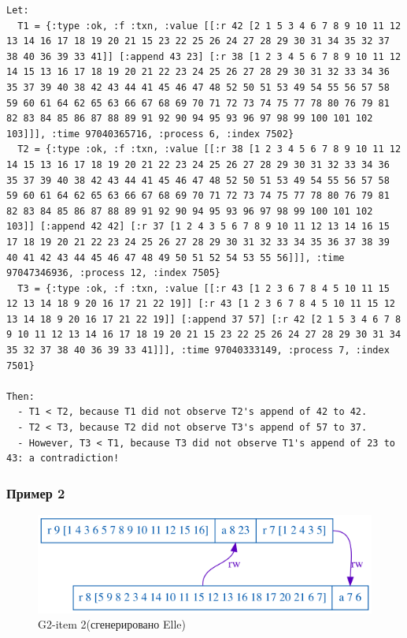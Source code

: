\documentclass[12pt,  openany]{book}
\begin{document}
\begin{lstlisting}[caption={Пояснение к G2-item 1 аномалии (сгенерировано Elle)}]
Let:
  T1 = {:type :ok, :f :txn, :value [[:r 42 [2 1 5 3 4 6 7 8 9 10 11 12 13 14 16 17 18 19 20 21 15 23 22 25 26 24 27 28 29 30 31 34 35 32 37 38 40 36 39 33 41]] [:append 43 23] [:r 38 [1 2 3 4 5 6 7 8 9 10 11 12 14 15 13 16 17 18 19 20 21 22 23 24 25 26 27 28 29 30 31 32 33 34 36 35 37 39 40 38 42 43 44 41 45 46 47 48 52 50 51 53 49 54 55 56 57 58 59 60 61 64 62 65 63 66 67 68 69 70 71 72 73 74 75 77 78 80 76 79 81 82 83 84 85 86 87 88 89 91 92 90 94 95 93 96 97 98 99 100 101 102 103]]], :time 97040365716, :process 6, :index 7502}
  T2 = {:type :ok, :f :txn, :value [[:r 38 [1 2 3 4 5 6 7 8 9 10 11 12 14 15 13 16 17 18 19 20 21 22 23 24 25 26 27 28 29 30 31 32 33 34 36 35 37 39 40 38 42 43 44 41 45 46 47 48 52 50 51 53 49 54 55 56 57 58 59 60 61 64 62 65 63 66 67 68 69 70 71 72 73 74 75 77 78 80 76 79 81 82 83 84 85 86 87 88 89 91 92 90 94 95 93 96 97 98 99 100 101 102 103]] [:append 42 42] [:r 37 [1 2 4 3 5 6 7 8 9 10 11 12 13 14 16 15 17 18 19 20 21 22 23 24 25 26 27 28 29 30 31 32 33 34 35 36 37 38 39 40 41 42 43 44 45 46 47 48 49 50 51 52 54 53 55 56]]], :time 97047346936, :process 12, :index 7505}
  T3 = {:type :ok, :f :txn, :value [[:r 43 [1 2 3 6 7 8 4 5 10 11 15 12 13 14 18 9 20 16 17 21 22 19]] [:r 43 [1 2 3 6 7 8 4 5 10 11 15 12 13 14 18 9 20 16 17 21 22 19]] [:append 37 57] [:r 42 [2 1 5 3 4 6 7 8 9 10 11 12 13 14 16 17 18 19 20 21 15 23 22 25 26 24 27 28 29 30 31 34 35 32 37 38 40 36 39 33 41]]], :time 97040333149, :process 7, :index 7501}

Then:
  - T1 < T2, because T1 did not observe T2's append of 42 to 42.
  - T2 < T3, because T2 did not observe T3's append of 57 to 37.
  - However, T3 < T1, because T3 did not observe T1's append of 23 to 43: a contradiction!
\end{lstlisting}
\subsubsection{Пример 2}
\begin{figure}[H]
  \includegraphics[width=\textwidth]{strong/42.png}
  \caption{G2-item 2(сгенерировано Elle)}
\end{figure}
\par
\end{document}

